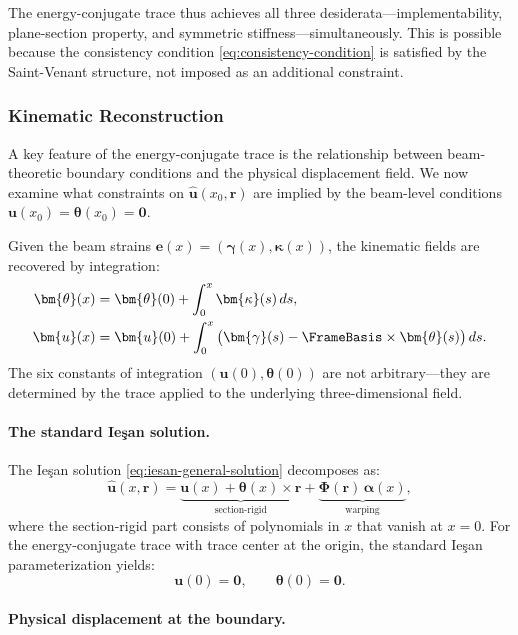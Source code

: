The energy-conjugate trace thus achieves all three desiderata---implementability, 
plane-section property, and symmetric stiffness---simultaneously. This is 
possible because the consistency condition \eqref{eq:consistency-condition} 
is satisfied by the Saint-Venant structure, not imposed as an additional 
constraint.

\subsubsection{Kinematic Reconstruction}

A key feature of the energy-conjugate trace is the relationship between 
beam-theoretic boundary conditions and the physical displacement field. 
We now examine what constraints on $\hat{\bm{u}}(x_0, \bm{r})$ are implied 
by the beam-level conditions $\bm{u}(x_0) = \bm{\theta}(x_0) = \mathbf{0}$.

Given the beam strains $\bm{e}(x) = (\bm{\gamma}(x), \bm{\kappa}(x))$, the 
kinematic fields are recovered by integration:
\begin{align}
\bm{\theta}(x) &= \bm{\theta}(0) + \int_0^x \bm{\kappa}(s)\,ds, \\
\bm{u}(x) &= \bm{u}(0) + \int_0^x \big(\bm{\gamma}(s) - \FrameBasis \times \bm{\theta}(s)\big)\,ds.
\end{align}
The six constants of integration $(\bm{u}(0), \bm{\theta}(0))$ are not 
arbitrary---they are determined by the trace applied to the underlying 
three-dimensional field.

\paragraph{The standard Ieşan solution.}

The Ieşan solution \eqref{eq:iesan-general-solution} decomposes as:
\begin{equation}
\hat{\bm{u}}(x, \bm{r}) = \underbrace{\bm{u}(x) + \bm{\theta}(x) \times \bm{r}}_{\text{section-rigid}} 
+ \underbrace{\bm{\Phi}(\bm{r})\,\bm{\alpha}(x)}_{\text{warping}},
\end{equation}
where the section-rigid part consists of polynomials in $x$ that vanish at 
$x = 0$. For the energy-conjugate trace with trace center at the origin, 
the standard Ieşan parameterization yields:
\begin{equation}
\bm{u}(0) = \mathbf{0}, \qquad \bm{\theta}(0) = \mathbf{0}.
\end{equation}

\paragraph{Physical displacement at the boundary.}

